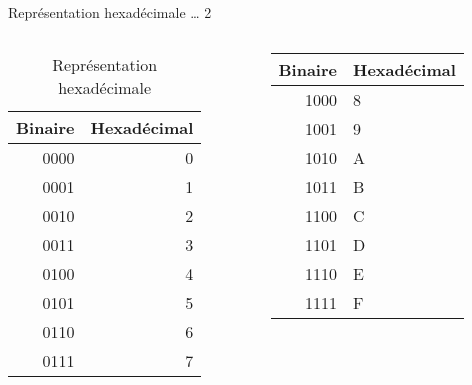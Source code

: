 \documentclass[presentation]{beamer}
\begin{document}
\begin{frame}[label={sec:org08960a1}]{Représentation hexadécimale \ldots{} 2}
\begin{columns}
\begin{column}{0.48\columnwidth}
\begin{block}{}
\begin{table}[htbp]
\caption{\label{tab:orgfadd90d}Représentation hexadécimale}
\centering
\begin{tabular}{rr}
Binaire & Hexadécimal\\
\hline
0000 & 0\\
0001 & 1\\
0010 & 2\\
0011 & 3\\
0100 & 4\\
0101 & 5\\
0110 & 6\\
0111 & 7\\
\end{tabular}
\end{table}
\end{block}
\end{column}

\begin{column}{0.48\columnwidth}
\begin{block}{}
\begin{center}
\begin{tabular}{rl}
Binaire & Hexadécimal\\
\hline
1000 & 8\\
1001 & 9\\
1010 & A\\
1011 & B\\
1100 & C\\
1101 & D\\
1110 & E\\
1111 & F\\
\end{tabular}
\end{center}
\end{block}
\end{column}
\end{columns}
\end{frame}
\end{document}
